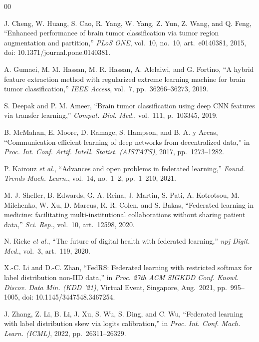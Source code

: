 \documentclass[journal]{IEEEtran}
\begin{document}
\begin{thebibliography}{00}

J. Cheng, W. Huang, S. Cao, R. Yang, W. Yang, Z. Yun, Z. Wang, and Q. Feng,
``Enhanced performance of brain tumor classification via tumor region
augmentation and partition,'' \emph{PLoS ONE}, vol.~10, no.~10, art.~e0140381,
2015, doi: 10.1371/journal.pone.0140381.

A. Gumaei, M. M. Hassan, M. R. Hassan, A. Alelaiwi, and G. Fortino, ``A hybrid
feature extraction method with regularized extreme learning machine for brain
tumor classification,'' \emph{IEEE Access}, vol.~7, pp.~36266--36273, 2019.

S. Deepak and P. M. Ameer, ``Brain tumor classification using deep CNN features
via transfer learning,'' \emph{Comput. Biol. Med.}, vol.~111, p.~103345, 2019.

B. McMahan, E. Moore, D. Ramage, S. Hampson, and B. A. y Arcas,
``Communication-efficient learning of deep networks from decentralized data,''
in \emph{Proc. Int. Conf. Artif. Intell. Statist. (AISTATS)}, 2017,
pp.~1273--1282.

P. Kairouz \emph{et al.}, ``Advances and open problems in federated learning,''
\emph{Found. Trends Mach. Learn.}, vol.~14, no.~1--2, pp.~1--210, 2021.

M. J. Sheller, B. Edwards, G. A. Reina, J. Martin, S. Pati, A. Kotrotsou,
M. Milchenko, W. Xu, D. Marcus, R. R. Colen, and S. Bakas, ``Federated learning
in medicine: facilitating multi-institutional collaborations without sharing
patient data,'' \emph{Sci. Rep.}, vol.~10, art.~12598, 2020.

N. Rieke \emph{et al.}, ``The future of digital health with federated
learning,'' \emph{npj Digit. Med.}, vol.~3, art.~119, 2020.

X.-C. Li and D.-C. Zhan, ``FedRS: Federated learning with restricted softmax for
label distribution non-IID data,'' in \emph{Proc. 27th ACM SIGKDD Conf. Knowl.
Discov. Data Min. (KDD '21)}, Virtual Event, Singapore, Aug.~2021,
pp.~995--1005, doi: 10.1145/3447548.3467254.

J. Zhang, Z. Li, B. Li, J. Xu, S. Wu, S. Ding, and C. Wu, ``Federated learning
with label distribution skew via logits calibration,'' in \emph{Proc. Int. Conf.
Mach. Learn. (ICML)}, 2022, pp.~26311--26329.


\end{thebibliography}
\end{document}

